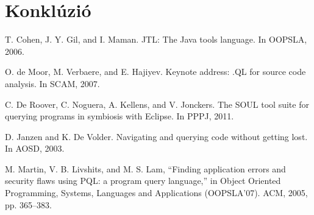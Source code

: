 \documentclass[a4paper,12pt]{report}
\begin{document}
\chapter{Konklúzió}

\begin{thebibliography}{99}
	 T. Cohen, J. Y. Gil, and I. Maman. JTL: The Java tools
	language. In OOPSLA, 2006.
	
	 O. de Moor, M. Verbaere, and E. Hajiyev. Keynote address:
	.QL for source code analysis. In SCAM, 2007.
	
	 C. De Roover, C. Noguera, A. Kellens, and V. Jonckers. The
	SOUL tool suite for querying programs in symbiosis with
	Eclipse. In PPPJ, 2011.
	
	 D. Janzen and K. De Volder. Navigating and querying code
	without getting lost. In AOSD, 2003.
	
	  M. Martin, V. B. Livshits, and M. S. Lam, “Finding application
	errors and security flaws using PQL: a program query language,” 
	in Object Oriented Programming, Systems, Languages and Applications (OOPSLA’07). ACM, 2005, pp.	365–383.
	
\end{thebibliography}
	
\end{document}
